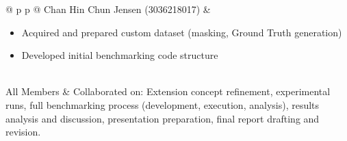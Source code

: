 \documentclass{article}
\begin{document}
\begin{center}
\begin{tabular}{@{} p{\membercolwidthB} p{\contribcolwidthB} @{}}
        \midrule
        Chan Hin Chun Jensen (3036218017) &
        \begin{minipage}[t]{\linewidth}
            \begin{itemize}[topsep=0pt, partopsep=0pt, itemsep=0pt, parsep=0pt, leftmargin=*, after=\strut]
                \item Acquired and prepared custom dataset (masking, Ground Truth generation)
                \item Developed initial benchmarking code structure
            \end{itemize}
        \end{minipage}                                                                                                                                                                                                 \\
        \midrule
        All Members                       &                                                                                                                                                                                            %
        Collaborated on: Extension concept refinement, experimental runs, full benchmarking process (development, execution, analysis), results analysis and discussion, presentation preparation, final report drafting and revision. \\
        \bottomrule
    \end{tabular}
\end{center}
\end{document}
